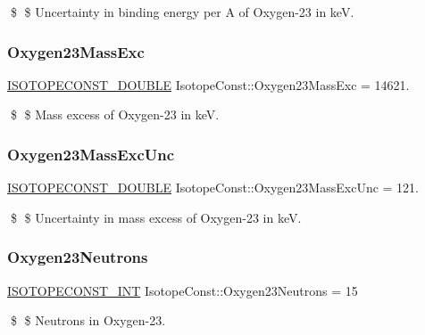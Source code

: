 \$ \$ Uncertainty in binding energy per A of Oxygen-\/23 in keV. \mbox{\label{group___isotope_const-_oxygen-_o23_ga8a569dd1b58af038d90e1d3456e13e71}} 
\subsubsection{\texorpdfstring{Oxygen23\+Mass\+Exc}{Oxygen23MassExc}}
{\footnotesize\ttfamily \mbox{\hyperlink{group___isotope_const-_macros_ga8f45a7272ce02c0b4c65c44636ed719a}{I\+S\+O\+T\+O\+P\+E\+C\+O\+N\+S\+T\+\_\+\+D\+O\+U\+B\+LE}} Isotope\+Const\+::\+Oxygen23\+Mass\+Exc = 14621.}

\$ \$ Mass excess of Oxygen-\/23 in keV. \mbox{\label{group___isotope_const-_oxygen-_o23_gac48ba5c669edf47096ffacd1b52e638c}} 
\subsubsection{\texorpdfstring{Oxygen23\+Mass\+Exc\+Unc}{Oxygen23MassExcUnc}}
{\footnotesize\ttfamily \mbox{\hyperlink{group___isotope_const-_macros_ga8f45a7272ce02c0b4c65c44636ed719a}{I\+S\+O\+T\+O\+P\+E\+C\+O\+N\+S\+T\+\_\+\+D\+O\+U\+B\+LE}} Isotope\+Const\+::\+Oxygen23\+Mass\+Exc\+Unc = 121.}

\$ \$ Uncertainty in mass excess of Oxygen-\/23 in keV. \mbox{\label{group___isotope_const-_oxygen-_o23_gae89503b74a3cd3c6c871e8c097de8bda}} 
\subsubsection{\texorpdfstring{Oxygen23\+Neutrons}{Oxygen23Neutrons}}
{\footnotesize\ttfamily \mbox{\hyperlink{group___isotope_const-_macros_ga5f18360b3e99483a35c32d789e62621c}{I\+S\+O\+T\+O\+P\+E\+C\+O\+N\+S\+T\+\_\+\+I\+NT}} Isotope\+Const\+::\+Oxygen23\+Neutrons = 15}

\$ \$ Neutrons in Oxygen-\/23. \mbox{\label{group___isotope_const-_oxygen-_o23_ga75e557d367ff04ae1cbc48bef1b2df99}} 
